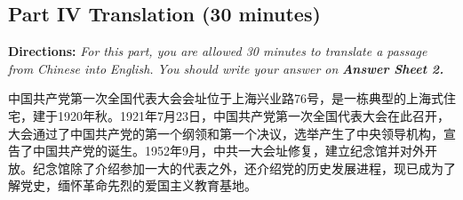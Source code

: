 \documentclass[UTF8,11pt]{ctexart}
\begin{document}
\subsection*{\textbf{Part IV} \textbf{Translation} \textbf{(30 minutes)}}


\textbf{Directions: }\textit{For this part, you are allowed 30 minutes to translate a passage from Chinese into} \textit{English. You should write your answer on }\textbf{\textit{Answer Sheet 2.}}


中国共产党第一次全国代表大会会址位于上海兴业路76号，是一栋典型的上海式住宅，建于1920年秋。1921年7月23日，中国共产党第一次全国代表大会在此召开，大会通过了中国共产党的第一个纲领和第一个决议，选举产生了中央领导机构，宣告了中国共产党的诞生。1952年9月，中共一大会址修复，建立纪念馆并对外开放。纪念馆除了介绍参加一大的代表之外，还介绍党的历史发展进程，现已成为了解党史，缅怀革命先烈的爱国主义教育基地。
\end{document}
